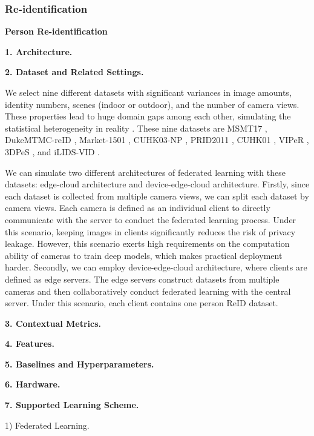 
\subsubsection{Re-identification}
\textbf{Person Re-identification}

\textbf{1. Architecture.}

\textbf{2. Dataset and Related Settings.} 

We select nine different datasets with significant variances in image amounts, identity numbers, scenes (indoor or outdoor), and the number of camera views. These properties lead to huge domain gaps among each other, simulating the statistical heterogeneity in reality \cite{zhuang2020fedreid}. These nine datasets are MSMT17 \cite{Wei2017Msmt}, DukeMTMC-reID \cite{zheng2017dukemtmc-reid}, 
Market-1501 \cite{Zheng2015Market1501}, CUHK03-NP \cite{Li2014CUHK03}, PRID2011 \cite{prid2011}, CUHK01 \cite{li2012cuhk01}, VIPeR \cite{Gray2008ViewpointIP}, 3DPeS \cite{3dpes}, and iLIDS-VID \cite{iLIDS-VID}. 

We can simulate two different architectures of federated learning with these datasets: edge-cloud architecture and device-edge-cloud architecture. Firstly, since each dataset is collected from multiple camera views, we can split each dataset by camera views. Each camera is defined as an individual client to directly communicate with the server to conduct the federated learning process. Under this scenario, keeping images in clients significantly reduces the risk of privacy leakage. However, this scenario exerts high requirements on the computation ability of cameras to train deep models, which makes practical deployment harder. Secondly, we can employ device-edge-cloud architecture, where clients are defined as edge servers. The edge servers construct datasets from multiple cameras and then collaboratively conduct federated learning with the central server. Under this scenario, each client contains one person ReID dataset.

\textbf{3. Contextual Metrics.}

\textbf{4. Features.}

\textbf{5. Baselines and Hyperparameters.}

\textbf{6. Hardware.}

\textbf{7. Supported Learning Scheme.}

1) Federated Learning.
